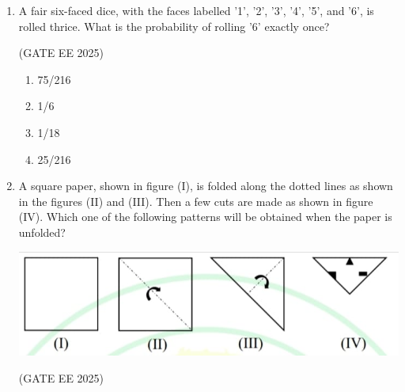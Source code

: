 \documentclass[journal,12pt,onecolumn]{IEEEtran}
\theoremstyle{remark}
\begin{document}
\begin{enumerate}
\hfill(GATE EE 2025)

\begin{multicols}{4}
\begin{enumerate}
\item 1/3
\item 1/4
\item 2/5
\item 1/2
\end{enumerate}
\end{multicols}

\item A fair six-faced dice, with the faces labelled '1', '2', '3', '4', '5', and '6', is rolled thrice. 
What is the probability of rolling '6' exactly once?

\hfill(GATE EE 2025)

\begin{multicols}{4}
\begin{enumerate}
\item 75/216
\item 1/6
\item 1/18
\item 25/216
\end{enumerate}
\end{multicols}

\item A square paper, shown in figure (I), is folded along the dotted lines as shown in the figures (II) and (III). 
Then a few cuts are made as shown in figure (IV). 
Which one of the following patterns will be obtained when the paper is unfolded?  

 \includegraphics[width=0.5\linewidth]{figs/Fig 2.jpg}
 
\hfill(GATE EE 2025)

\begin{multicols}{2}
\begin{enumerate}


\end{enumerate}
\end{multicols}
\end{enumerate}
\end{document}
